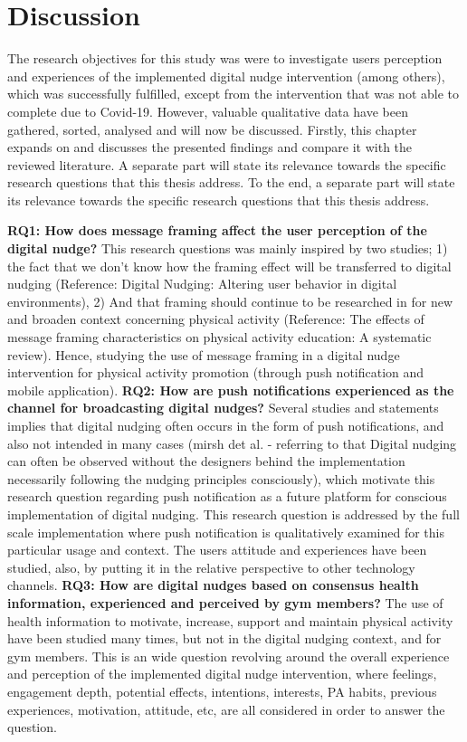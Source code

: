 \chapter{Discussion}
The research objectives for this study was were to investigate users perception and experiences of the implemented digital nudge intervention (among others), which was successfully fulfilled, except from the intervention that was not able to complete due to Covid-19. However, valuable qualitative data have been gathered, sorted, analysed and will now be discussed. Firstly, this chapter expands on and discusses the presented findings and compare it with the reviewed literature. A separate part will state its relevance towards the specific research questions that this thesis address. To the end, a separate part will state its relevance towards the specific research questions that this thesis address.  

\bigbreak
\textbf{RQ1: How does message framing affect the user perception of the digital nudge?}
\bigbreak
This research questions was mainly inspired by two studies; 1) the fact that we don't know how the framing effect will be transferred to digital nudging (Reference: Digital Nudging: Altering user behavior in digital environments), 2) And that framing should continue to be researched in for new and broaden context concerning physical activity (Reference: The effects of message framing characteristics on physical activity education: A systematic review). Hence, studying the use of message framing in a digital nudge intervention for physical activity promotion (through push notification and mobile application). 
\bigbreak
\textbf{RQ2: How are push notifications experienced as the channel for broadcasting digital nudges?}
\bigbreak
Several studies and statements implies that digital nudging often occurs in the form of push notifications, and also not intended in many cases (mirsh det al. - referring to that Digital nudging can often be observed without the designers behind the implementation necessarily following the nudging principles consciously), which motivate this research question regarding push notification as a future platform for conscious implementation of digital nudging. This research question is addressed by the full scale implementation where push notification is qualitatively examined for this particular usage and context. The users attitude and experiences have been studied, also, by putting it in the relative perspective to other technology channels. 
\bigbreak
\textbf{RQ3: How are digital nudges based on consensus health information, experienced and perceived by gym members? }
\bigbreak
The use of health information to motivate, increase, support and maintain physical activity have been studied many times, but not in the digital nudging context, and for gym members. This is an wide question revolving around the overall experience and perception of the implemented digital nudge intervention, where feelings, engagement depth, potential effects, intentions, interests, PA habits, previous experiences, motivation, attitude, etc, are all considered in order to answer the question. 

